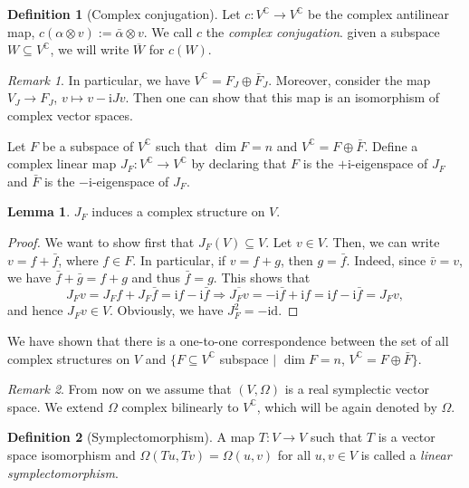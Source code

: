 \documentclass[11pt]{amsart}
\numberwithin{equation}{section}
\theoremstyle{plain}
\theoremstyle{definition}
\newtheorem{defn}{Definition}[subsection]
\newtheorem{lem}{Lemma}[subsection]
\theoremstyle{remark}
\newtheorem{rem}{Remark}[subsection]
\newcommand{\id}{\mathrm{id}}
\newcommand{\I}{\mathrm{i}}
\begin{document}
\begin{defn}[Complex conjugation]
Let $c\colon V^\mathbb{C}\to V^\mathbb{C}$ be the complex antilinear map, $c(\alpha\otimes v):=\bar\alpha\otimes v$. We call $c$ the \emph{complex conjugation}. given a subspace $W\subseteq V^\mathbb{C}$, we will write $\overline{W}$ for $c(W)$. 
\end{defn}

\begin{rem}
In particular, we have $V^\mathbb{C}=F_J\oplus \bar F_J$. Moreover, consider the map $V_J\to F_J$, $v\mapsto v-\I Jv$. Then one can show that this map is an isomorphism of complex vector spaces.
\end{rem}

Let $F$ be a subspace of $V^\mathbb{C}$ such that $\dim F=n$ and $V^\mathbb{C}=F\oplus \bar F$. Define a complex linear map $J_F\colon V^\mathbb{C}\to V^\mathbb{C}$ by declaring that $F$ is the $+\I$-eigenspace of $J_F$ and $\bar F$ is the $-\I$-eigenspace of $J_F$. 

\begin{lem}
$J_F$ induces a complex structure on $V$.
\end{lem}

\begin{proof}
We want to show first that $J_F(V)\subseteq V$. Let $v\in V$. Then, we can write $v=f+\bar f$, where $f\in F$. In particular, if $v=f+g$, then $g=\bar f$. Indeed, since $\bar v=v$, we have $\bar f+\bar g=f+g$ and thus $\bar f=g$. This shows that
$$J_Fv=J_Ff+J_F\bar f=\I f-\I \bar f\Rightarrow \overline{J_Fv}=-\I \bar f+\I f=\I f-\I \bar f=J_Fv,$$
and hence $J_Fv\in V$. Obviously, we have $J_F^2=-\id$.
\end{proof}

We have shown that there is a one-to-one correspondence between the set of all complex structures on $V$ and $\{F\subseteq V^\mathbb{C}$ subspace $\mid$ $\dim F=n$, $V^\mathbb{C}=F\oplus \bar F\}$. 

\begin{rem}
From now on we assume that $(V,\Omega)$ is a real symplectic vector space. We extend $\Omega$ complex bilinearly to $V^\mathbb{C}$, which will be again denoted by $\Omega$.
\end{rem}

\begin{defn}[Symplectomorphism]
A map $T\colon V\to V$ such that $T$ is a vector space isomorphism and $\Omega(Tu,Tv)=\Omega(u,v)$ for all $u,v\in V$ is called a \emph{linear symplectomorphism}.
\end{defn}
\end{document}
